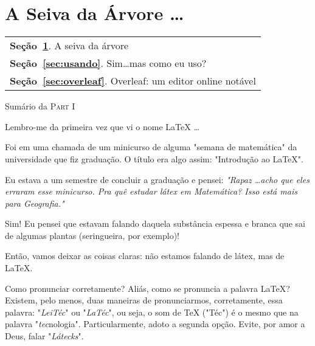 \section{A Seiva da Árvore \ldots}\label{sec:seiva} %

\begin{margintable}\vspace{.8in}\footnotesize
  \begin{tabularx}{\marginparwidth}{|X}
    \textbf{\sffamily \textcolor{azulUFRB}{Seção}~\ref{sec:seiva}}.    {\sffamily A seiva da árvore}                  \\
    \textbf{\sffamily \textcolor{azulUFRB}{Seção}~\ref{sec:usando}}.   {\sffamily Sim\ldots mas como eu uso?}         \\
    \textbf{\sffamily \textcolor{azulUFRB}{Seção}~\ref{sec:overleaf}}. {\sffamily Overleaf: um editor online notável} \\
  \end{tabularx}
  \caption{Sumário da \textsc{Part I}}
\end{margintable}

Lembro-me da primeira vez que vi o nome \LaTeX{} \ldots

Foi em uma chamada de um minicurso de alguma "semana de matemática" da 
universidade que fiz graduação.
O título era algo assim: "Introdução ao \LaTeX".

Eu estava a um semestre de concluir a graduação e pensei: 
\textit{
  "Rapaz \ldots acho que eles erraram esse minicurso. 
  Pra quê estudar látex em Matemática? 
  Isso está mais para Geografia."
}

Sim! 
Eu pensei que estavam falando daquela substância espessa e branca que sai de 
algumas plantas (seringueira, por exemplo)!

Então, vamos deixar as coisas claras: não estamos falando de látex, mas de \LaTeX.

\begin{atencao}{Como pronunciar corretamente?}{\exclamacao}
  Aliás, como se pronuncia a palavra \LaTeX?\\
  Existem, pelo menos, duas maneiras de pronunciarmos, corretamente, essa palavra:
  "\textit{LeiTéc}" ou "\textit{LaTéc}", ou seja, o som de \TeX{} ("Téc") é o 
  mesmo que na palavra "\textit{tec}nologia". 
  Particularmente, adoto a segunda opção.
  Evite, por amor a Deus, falar "\textit{Látecks}".
\end{atencao}



